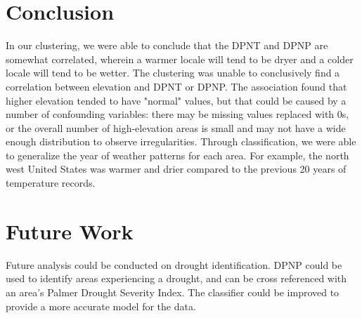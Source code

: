 \documentclass[11pt]{article}
\begin{document}
\section{Conclusion}

In our clustering, we were able to conclude that the DPNT and DPNP are somewhat correlated, wherein a warmer locale will tend to be dryer and a colder locale will tend to be wetter. The clustering was unable to conclusively find a correlation between elevation and DPNT or DPNP. The association found that higher elevation tended to have "normal" values, but that could be caused by a number of confounding variables: there may be missing values replaced with 0s, or the overall number of high-elevation areas is small and may not have a wide enough distribution to observe irregularities.
Through classification, we were able to generalize the year of weather patterns for each area. For example, the north west United States was warmer and drier compared to the previous 20 years of temperature records.

\section{Future Work}
Future analysis could be conducted on drought identification. DPNP could be used to identify areas experiencing a drought, and can be cross referenced with an area's Palmer Drought Severity Index. The classifier could be improved to provide a more accurate model for the data.


\end{document}
